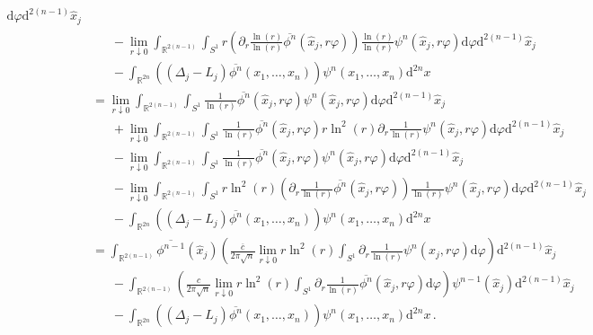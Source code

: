 \begin{align*}
  \mathrm{d}\varphi
  \mathrm{d}^{2(n-1)}\hat{x}_{j}
  \\
  &\phantom{=\ }
  -
  \lim_{r \downarrow 0}
  \int_{\mathbb{R}^{2(n-1)}}
  \int_{S^{1}}
  r
  \left(
    \partial_{r}
    \frac{\ln(r)}{\ln(r)}
    \overline{\phi^{n}}(\hat{x}_{j},r\varphi)
  \right)
  \frac{\ln(r)}{\ln(r)}
  \psi^{n}(\hat{x}_{j},r\varphi)
  \mathrm{d}\varphi
  \mathrm{d}^{2(n-1)}\hat{x}_{j}
  \\
  &\phantom{=\ }
  -
  \int_{\mathbb{R}^{2n}}
  \left(
    (\Delta_{j} - L_{j})
    \overline{\phi^{n}}
    \left(
      x_{1}
      ,
      \dots
      ,
      x_{n}
    \right)
  \right)
  \psi^{n}(x_{1},\dots,x_{n})
  \mathrm{d}^{2n}x
  \\
  &=
  \lim_{r \downarrow 0}
  \int_{\mathbb{R}^{2(n-1)}}
  \int_{S^{1}}
  \frac{1}{\ln(r)}
  \overline{\phi^{n}}(\hat{x}_{j},r\varphi)
  \psi^{n}(\hat{x}_{j},r\varphi)
  \mathrm{d}\varphi
  \mathrm{d}^{2(n-1)}\hat{x}_{j}
  \\
  &\phantom{=\ }
  +
  \lim_{r \downarrow 0}
  \int_{\mathbb{R}^{2(n-1)}}
  \int_{S^{1}}
  \frac{1}{\ln(r)}
  \overline{\phi^{n}}(\hat{x}_{j},r\varphi)
  r
  \ln^{2}(r)
  \partial_{r}
  \frac{1}{\ln(r)}
  \psi^{n}(\hat{x}_{j},r\varphi)
  \mathrm{d}\varphi
  \mathrm{d}^{2(n-1)}\hat{x}_{j}
  \\
  &\phantom{=\ }
  -
  \lim_{r \downarrow 0}
  \int_{\mathbb{R}^{2(n-1)}}
  \int_{S^{1}}
  \frac{1}{\ln(r)}
  \overline{\phi^{n}}(\hat{x}_{j},r\varphi)
  \psi^{n}(\hat{x}_{j},r\varphi)
  \mathrm{d}\varphi
  \mathrm{d}^{2(n-1)}\hat{x}_{j}
  \\
  &\phantom{=\ }
  -
  \lim_{r \downarrow 0}
  \int_{\mathbb{R}^{2(n-1)}}
  \int_{S^{1}}
  r
  \ln^{2}(r)
  \left(
    \partial_{r}
    \frac{1}{\ln(r)}
    \overline{\phi^{n}}(\hat{x}_{j},r\varphi)
  \right)
  \frac{1}{\ln(r)}
  \psi^{n}(\hat{x}_{j},r\varphi)
  \mathrm{d}\varphi
  \mathrm{d}^{2(n-1)}\hat{x}_{j}
  \\
  &\phantom{=\ }
  -
  \int_{\mathbb{R}^{2n}}
  \left(
    (\Delta_{j} - L_{j})
    \overline{\phi^{n}}
    \left(
      x_{1}
      ,
      \dots
      ,
      x_{n}
    \right)
  \right)
  \psi^{n}(x_{1},\dots,x_{n})
  \mathrm{d}^{2n}x
  \\
  &=
  \int_{\mathbb{R}^{2(n-1)}}
  \overline{\phi^{n-1}}(\hat{x}_{j})
  \left(
    \frac{\overline{c}}{2\pi\sqrt{n}}
    \lim_{r \downarrow 0}
    r
    \ln^{2}(r)
    \int_{S^{1}}
    \partial_{r}
    \frac{1}{\ln(r)}
    \psi^{n}(\hat{x}_{j},r\varphi)
    \mathrm{d}\varphi
  \right)
  \mathrm{d}^{2(n-1)}\hat{x}_{j}
  \\
  &\phantom{=\ }
  -
  \int_{\mathbb{R}^{2(n-1)}}
  \left(
    \frac{c}{2\pi\sqrt{n}}
    \lim_{r \downarrow 0}
    r
    \ln^{2}(r)
    \int_{S^{1}}
    \partial_{r}
    \frac{1}{\ln(r)}
    \overline{\phi^{n}}(\hat{x}_{j},r\varphi)
    \mathrm{d}\varphi
  \right)
  \psi^{n-1}(\hat{x}_{j})
  \mathrm{d}^{2(n-1)}\hat{x}_{j}
  \\
  &\phantom{=\ }
  -
  \int_{\mathbb{R}^{2n}}
  \left(
    (\Delta_{j} - L_{j})
    \overline{\phi^{n}}
    \left(
      x_{1}
      ,
      \dots
      ,
      x_{n}
    \right)
  \right)
  \psi^{n}
  \left(
    x_{1}
    ,
    \dots
    ,
    x_{n}
  \right)
  \mathrm{d}^{2n}x
  \,.
\end{align*}
